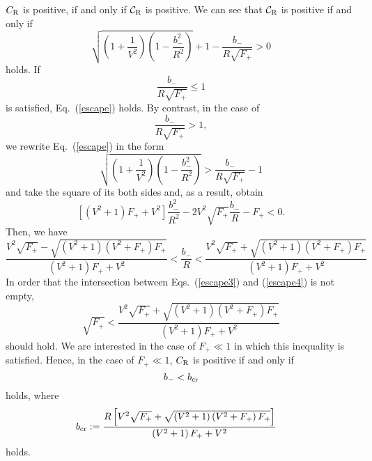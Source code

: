 \documentclass[aps,preprint,preprintnumber,nofootinbib,amsmath,amssymb,ascmac,bm,12pt]{revtex4}
\newcommand{\bmi}{b_-}
\newcommand{\Ro}{R_{\rm o}}
\begin{document}
$C_{\rm R}$ is positive, if and only if ${\cal C}_{\rm R}$ is positive. 
We can see that ${\cal C}_{\rm R}$ is positive if and only if 
\begin{equation}
\sqrt{\left(1+\frac{1}{V^2}\right)\left(1-\frac{\bmi^2}{R^2}\right)}+1
-\frac{\bmi}{R\sqrt{F_+}}>0 \label{escape}
\end{equation}
holds. If 
\begin{equation}
\frac{\bmi}{R\sqrt{F_+}}\leq1 \label{escape2}
\end{equation}
is satisfied, Eq.~(\ref{escape}) holds. By contrast, in the case of 
\begin{equation}
\frac{\bmi}{R\sqrt{F_+}}>1, \label{escape3}
\end{equation}
we rewrite Eq.~(\ref{escape}) in the form
$$
\sqrt{\left(1+\frac{1}{V^2}\right)\left(1-\frac{\bmi^2}{R^2}\right)}>\frac{\bmi}{R\sqrt{F_+}}-1
$$
and take the square of its both sides and, as a result, obtain 
$$
\left[\left(V^2+1\right)F_+ +V^2\right]\frac{\bmi^2}{R^2}-2V^2\sqrt{F_+}\frac{\bmi}{R}-F_+<0.
$$
Then, we have
\begin{equation}
\frac{V^2\sqrt{F_+}-\sqrt{\left(V^2+1\right)\left(V^2+F_+\right)F_+}}
{\left(V^2+1\right)F_++V^2}
<\frac{\bmi}{R}
<\frac{V^2\sqrt{F_+}+\sqrt{\left(V^2+1\right)\left(V^2+F_+\right)F_+}}
{\left(V^2+1\right)F_++V^2} \label{escape4}
\end{equation}
In order that the intersection between Eqs.~(\ref{escape3}) and (\ref{escape4}) is not empty, 
$$
\sqrt{F_+}<\frac{V^2\sqrt{F_+}+\sqrt{\left(V^2+1\right)\left(V^2+F_+\right)F_+}}
{\left(V^2+1\right)F_+ +V^2}
$$
should hold. We are interested in the case of $F_+\ll1$ in which this inequality 
is satisfied. Hence, in the case of $F_+\ll1$, $C_{\rm R}$ is 
positive if and only if
\begin{equation}
\bmi< b_{\rm cr}
\end{equation}
holds, where
\begin{align}
b_{\rm cr}&:=\frac{R\left[V^2\sqrt{F_+}
+\sqrt{\left(V^2+1\right)\left(V^2+F_+\right)F_+}\right]}
{\left(V^2+1\right)F_++V^2} %
\end{align}
holds. 
\end{document}
